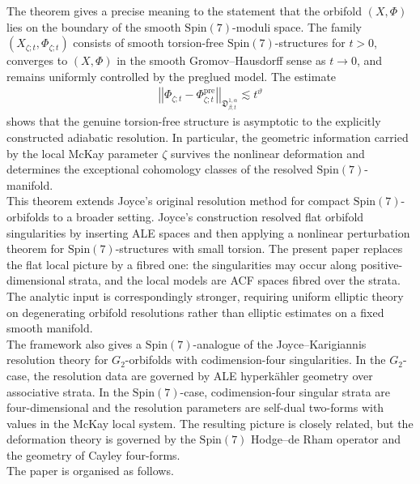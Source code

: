 \documentclass[psamsfonts]{amsart}
\theoremstyle{plain}
\theoremstyle{definition}{
\newtheorem{defi}{Definition}[section]
\newtheorem{ass}{Assumption}
\newtheorem*{nota}{Notation}}
\theoremstyle{remark}{
\newtheorem{rem}{Remark}
\newtheorem{ex}{Example}}
\theoremstyle{plain}{
\newtheorem{thm}{Theorem}[section]
\newtheorem{lem}{Lemma}[section]
\newtheorem{cor}{Corollary}[section]
\newtheorem{prop}{Proposition}[section]
\newtheorem{con}{Conjecture}[section]}
\newcommand{\m}[1]{{\mathrm{#1}}}
\begin{document}
The theorem gives a precise meaning to the statement that the orbifold $(X,\Phi)$ lies on the boundary of the smooth $\m{Spin}(7)$-moduli space. The family $(X_{\zeta;t},\Phi_{\zeta;t})$ consists of smooth torsion-free $\m{Spin}(7)$-structures for $t>0$, converges to $(X,\Phi)$ in the smooth Gromov--Hausdorff sense as $t\to 0$, and remains uniformly controlled by the preglued model. The estimate
\begin{align*}
    \left|\left|\Phi_{\zeta;t}-\Phi^{\m{pre}}_{\zeta;t}\right|\right|_{\mathfrak{D}^{1,\alpha}_{\beta;t}}
\lesssim t^{\vartheta}
\end{align*}
shows that the genuine torsion-free structure is asymptotic to the explicitly constructed adiabatic resolution. In particular, the geometric information carried by the local McKay parameter $\zeta$ survives the nonlinear deformation and determines the exceptional cohomology classes of the resolved $\m{Spin}(7)$-manifold.\\




This theorem extends Joyce's original resolution method \cite{Joyce1996b,Joyce1999} for compact $\m{Spin}(7)$-orbifolds to a broader setting. Joyce's construction resolved flat orbifold singularities by inserting ALE spaces and then applying a nonlinear perturbation theorem for $\m{Spin}(7)$-structures with small torsion. The present paper replaces the flat local picture by a fibred one: the singularities may occur along positive-dimensional strata, and the local models are ACF spaces fibred over the strata. The analytic input is correspondingly stronger, requiring uniform elliptic theory on degenerating orbifold resolutions rather than elliptic estimates on a fixed smooth manifold.\\

The framework also gives a $\m{Spin}(7)$-analogue of the Joyce--Karigiannis resolution theory \cite{joyce2017new} for $G_2$-orbifolds with codimension-four singularities. In the $G_2$-case, the resolution data are governed by ALE hyperkähler geometry over associative strata. In the $\m{Spin}(7)$-case, codimension-four singular strata are four-dimensional and the resolution parameters are self-dual two-forms with values in the McKay local system. The resulting picture is closely related, but the deformation theory is governed by the $\m{Spin}(7)$ Hodge--de Rham operator and the geometry of Cayley four-forms.\\

The paper is organised as follows.\\
\end{document}
